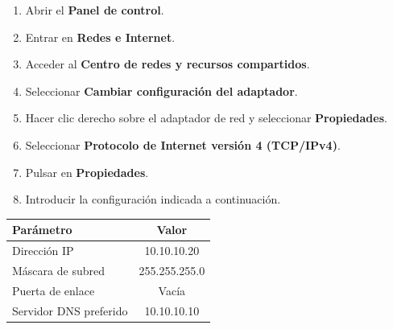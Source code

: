 \begin{tcolorbox}[
    enhanced,
    breakable,
    colback=black!3,
    colframe=black!15,
    boxrule=0.2pt,
    arc=2mm,
    left=4mm,
    right=4mm,
    top=2mm,
    bottom=2mm
]
\begin{enumerate}
    \item Abrir el \textbf{Panel de control}.
    \item Entrar en \textbf{Redes e Internet}.
    \item Acceder al \textbf{Centro de redes y recursos compartidos}.
    \item Seleccionar \textbf{Cambiar configuración del adaptador}.
    \item Hacer clic derecho sobre el adaptador de red y seleccionar \textbf{Propiedades}.
    \item Seleccionar \textbf{Protocolo de Internet versión 4 (TCP/IPv4)}.
    \item Pulsar en \textbf{Propiedades}.
    \item Introducir la configuración indicada a continuación.
\end{enumerate}
\end{tcolorbox}



\renewcommand{\arraystretch}{1.5}

\begin{table}[h]
    \centering

    \setlength{\arrayrulewidth}{0.05mm}

    \begin{tabular}{|l|c|}
        \hline
        \rowcolor{blue!10}
        \textbf{Parámetro} & \textbf{Valor} \\
        \hline
        Dirección IP & 10.10.10.20 \\
        \hline
        Máscara de subred & 255.255.255.0 \\
        \hline
        Puerta de enlace & Vacía \\
        \hline
        Servidor DNS preferido & 10.10.10.10 \\
        \hline
    \end{tabular}

    \renewcommand{\arraystretch}{1}
    \label{tab:stack_tecnologico_dev01}
\end{table}




